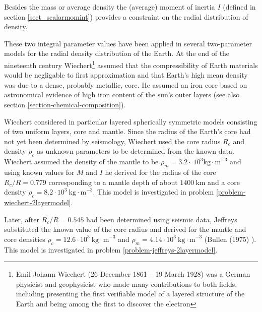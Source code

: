 Besides the mass or average density the (average) 
moment of inertia $I$ (defined in section \ref{sect_scalarmomint}) 
provides a constraint on the radial distribution of density.
     
These two integral parameter values have been applied in several 
two-parameter models for the radial density distribution of the Earth.
At the end of the nineteenth century Wiechert\footnote{Emil Johann 
Wiechert (26 December 1861 – 19 March 1928) was a German physicist 
and geophysicist who made many contributions to both fields, 
including presenting the first verifiable model of a layered structure of the 
Earth and being among the first to discover the electron} assumed that the 
compressibility of Earth materials would be negligable to first
approximation and that Earth's high mean density was due to a dense,
probably metallic, core.
He assumed an iron core based on astronomical evidence of high iron
content of the sun's outer layers 
(see also section \ref{section-chemical-composition}).

Wiechert considered in particular layered spherically symmetric 
models consisting of two uniform layers, core and mantle.
Since the radius of the Earth's core had not yet been determined by
seismology, Wiechert used the core radius $R_c$ and density 
$\rho_c$ as unknown parameters to be determined from the
known data.
Wiechert assumed the density of the mantle to be 
$\rho_m=3.2 \cdot~10^3 \mathrm{kg\cdot m}^{-3}$ and using known values for $M$ and $I$
he derived for the radius of the core
$R_c/R = 0.779$ corresponding to a mantle depth of about
$1400~\mathrm{km}$ and a core density 
$\rho_c=8.2\cdot 10^3~\mathrm{kg\cdot m}^{-3}$.
This model is investigated in problem 
\ref{problem-wiechert-2layermodel}.

Later, after $R_c/R = 0.545$ had been determined using
seismic data, Jeffreys substituted the known value of the
core radius and derived for the mantle and core densities
$\rho_c=12.6\cdot 10^3~ \mathrm{kg\cdot m}^{-3}$ and 
$\rho_m=4.14\cdot 10^3~ \mathrm{kg\cdot m}^{-3}$ (Bullen (1975) \cite{bull75}).
This model is investigated in problem 
\ref{problem-jeffreys-2layermodel}.

